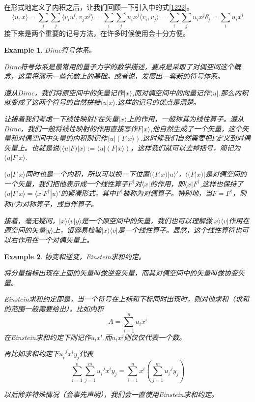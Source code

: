 \documentclass[11pt,a4paper,openany]{book}%
\theoremstyle{plain}%
\newtheorem{exa}{Example}[chapter]%
\begin{document}
在形式地定义了内积之后，让我们回顾一下引入中的式\eqref{1222}。
\[
\langle u,x \rangle=\sum_{i}\sum_{j}\langle v_iu^i,v_jx^j \rangle
=\sum_{i}\sum_{j}u_ix^j\langle v_i,v_j \rangle
=\sum_{i}\sum_{j}u_ix^j\delta_{j}^i=\sum_{i}u_ix^i
\]
\indent 接下来是两个重要的记号方法，在许多时候使用会十分方便。
\begin{exa}
Dirac符号体系。

Dirac符号体系是最常用的量子力学的数学描述，要点是采取了对偶空间这个概念，这里将演示一些代数上的基础。或者说，发展出一套新的符号体系。

遵从Dirac，我们将原空间中的矢量记作$|x \rangle$,而对偶空间中的向量记作$\langle u|$.那么内积就变成了这两个符号的自然拼接$\langle u|x \rangle$.这样的记号的优点是清楚。

让接着我们考虑一下线性映射$F$在矢量$|x \rangle$上的作用，一般称其为线性算子。遵从Dirac，我们一般将线性映射的作用直接写作$F|x \rangle$,他自然生成了一个矢量，这个矢量和对偶空间中矢量的内积则记作$\langle u|(F|x \rangle)$.这时候我们自然需要把$F$定义到对偶矢量上。也就是说$(\langle u|F)|x \rangle:=\langle u|(F|x \rangle)$，这样我们就可以去掉括号，简记为$\langle u|F|x \rangle$.

$\langle u|F|x \rangle$同时也是一个内积，所以可以换一下位置$\langle (F|x)|u \rangle'$，$\langle (F|x)|$是对偶空间的一个矢量，我们把他表示成一个线性算子$F^\dag$对$\langle x|$的作用，即$\langle x|F^\dag$,这样也保持了$\langle u|F|x \rangle=\langle x|F^\dag|u \rangle'$的紧凑形式，其中$F^\dag$被称为对偶算子。特别地，当$F=F^\dag$，则称$F$为对称算子，或自伴算子。

接着，毫无疑问，$|x \rangle \langle v|y\rangle$是一个原空间中的矢量，我们也可以理解做$|x \rangle \langle v|$作用在原空间的矢量$|y\rangle$上，很容易检验$|x \rangle \langle v|$是一个线性算子。显然，这个线性算符也可以右作用在一个对偶矢量上。
\end{exa}
\begin{exa}
协变和逆变，Einstein求和约定。

将分量指标出现在上面的矢量叫做逆变矢量，而其对偶空间中的矢量叫做协变矢量。

Einstein求和约定即是，当一个符号在上标和下标同时出现时，则对他求和（求和的范围一般需要给出）。比如内积
\[
A=\sum_{i=1}^n u_ix^i
\]
在Einstein求和约定下则记作$u_ix^i$.而$u_ix^j$则仅仅代表一个数。

再比如求和约定下$u_{i}^{\,\,\,j}x^i y_j$代表
\[
\sum_{i=1}^n \sum_{j=1}^m u_{i}^{\,\,\,j}x^i y_j=\sum_{i=1}^n x^i\left(\sum_{j=1}^m u_{i}^{\,\,\,j} y_j\right)
\]

以后除非特殊情况（会事先声明），我们会一直使用Einstein求和约定。
\end{exa}
\end{document}
